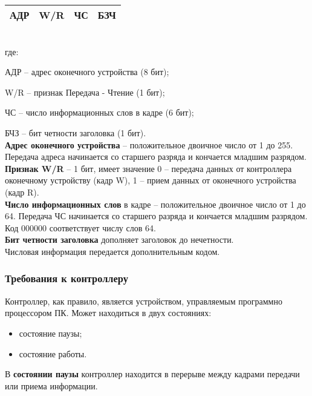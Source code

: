 		\begin{tabular}{ | c | c | c | c | }
			\hline
			АДР & W/R & ЧС & БЗЧ \\
			\hline
		\end{tabular}
		\\
		
		где:
		
		\qquad АДР –  адрес оконечного устройства (8 бит);
		
		\qquad W/R – признак Передача - Чтение (1 бит);
		
		\qquad ЧС   – число информационных слов в кадре (6 бит);
		
		\qquad БЧЗ  – бит четности заголовка (1 бит). \\
		
		\textbf{Адрес оконечного устройства} – положительное двоичное число от 1 до 255. Передача адреса начинается со старшего разряда и кончается младшим разрядом. \\
		
		\textbf{Признак W/R} – 1 бит, имеет значение 0 – передача данных от контроллера оконечному устройству (кадр W), 1 – прием данных от оконечного устройства (кадр R). \\
		
		\textbf{Число информационных слов} в кадре – положительное двоичное число от 1 до 64. Передача ЧС начинается со старшего разряда и кончается младшим разрядом. Код 000000 соответствует числу слов 64. \\
		
		\textbf{Бит четности заголовка} дополняет заголовок до нечетности. \cite{kmbo}\\
		
		Числовая информация передается дополнительным кодом.\\
		
		\subsubsection{Требования к контроллеру}
		Контроллер, как правило, является устройством, управляемым программно процессором ПК. 
		Может находиться в двух состояниях:
		\begin{itemize}
		\item состояние паузы;
		\item состояние работы.
		\end{itemize}
		
		В \textbf{состоянии паузы} контроллер находится в перерыве между кадрами передачи или приема информации. \\
		
